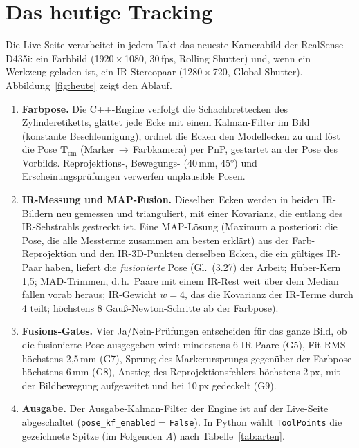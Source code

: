 \documentclass[11pt,a4paper,fleqn]{article}
\newcommand{\Tcm}{\mathbf{T}_{\mathrm{cm}}}
\newcommand{\code}[1]{\texttt{#1}}
\begin{document}
\section{Das heutige Tracking}
\label{sec:heute}

Die Live-Seite verarbeitet in jedem Takt das neueste Kamerabild der RealSense D435i: ein Farbbild
(1920\,$\times$\,1080, 30\,fps, Rolling Shutter) und, wenn ein Werkzeug geladen ist, ein IR-Stereopaar
(1280\,$\times$\,720, Global Shutter). Abbildung~\ref{fig:heute} zeigt den Ablauf.

\begin{enumerate}
  \item \textbf{Farbpose.} Die C++-Engine verfolgt die Schachbrettecken des Zylinderetiketts, glättet jede Ecke
        mit einem Kalman-Filter im Bild (konstante Beschleunigung), ordnet die Ecken den Modellecken zu und löst
        die Pose $\Tcm$ (Marker\,$\to$\,Farbkamera) per PnP, gestartet an der Pose des Vorbilds. Reprojektions-,
        Bewegungs- (40\,mm, 45°) und Erscheinungsprüfungen verwerfen unplausible Posen.
  \item \textbf{IR-Messung und MAP-Fusion.} Dieselben Ecken werden in beiden IR-Bildern neu gemessen und
        trianguliert, mit einer Kovarianz, die entlang des IR-Sehstrahls gestreckt ist. Eine MAP-Lösung
        (Maximum a posteriori: die Pose, die alle Messterme zusammen am besten erklärt) aus der
        Farb-Reprojektion und den IR-3D-Punkten derselben Ecken, die ein gültiges IR-Paar haben, liefert die
        \emph{fusionierte} Pose (Gl.~(3.27) der Arbeit; Huber-Kern 1,5; MAD-Trimmen, d.\,h.\ Paare mit einem
        IR-Rest weit über dem Median fallen vorab heraus; IR-Gewicht $w = 4$, das die Kovarianz der IR-Terme
        durch 4 teilt; höchstens 8 Gauß-Newton-Schritte ab der Farbpose).
  \item \textbf{Fusions-Gates.} Vier Ja/Nein-Prüfungen entscheiden für das ganze Bild, ob die fusionierte
        Pose ausgegeben wird: mindestens 6 IR-Paare (G5), Fit-RMS höchstens 2,5\,mm (G7), Sprung des
        Markerursprungs gegenüber der Farbpose höchstens 6\,mm (G8), Anstieg des Reprojektionsfehlers höchstens
        2\,px, mit der Bildbewegung aufgeweitet und bei 10\,px gedeckelt (G9).
  \item \textbf{Ausgabe.} Der Ausgabe-Kalman-Filter der Engine ist auf der Live-Seite abgeschaltet
        (\code{pose\_kf\_enabled} = \code{False}). In Python wählt \code{ToolPoints} die gezeichnete Spitze
        (im Folgenden \emph{A}) nach Tabelle~\ref{tab:arten}.
\end{enumerate}
\end{document}
